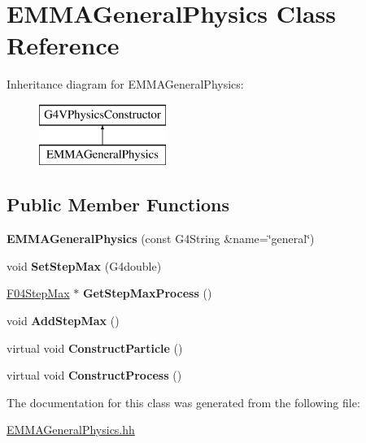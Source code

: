 \hypertarget{classEMMAGeneralPhysics}{\section{E\-M\-M\-A\-General\-Physics Class Reference}
\label{classEMMAGeneralPhysics}
}
Inheritance diagram for E\-M\-M\-A\-General\-Physics\-:\begin{figure}[H]
\begin{center}
\leavevmode
\includegraphics[height=2.000000cm]{classEMMAGeneralPhysics}
\end{center}
\end{figure}
\subsection*{Public Member Functions}
\begin{DoxyCompactItemize}
\item 
\hypertarget{classEMMAGeneralPhysics_a4c397d99e36849b09f1c90b991c97ee5}{{\bfseries E\-M\-M\-A\-General\-Physics} (const G4\-String \&name=\char`\"{}general\char`\"{})}\label{classEMMAGeneralPhysics_a4c397d99e36849b09f1c90b991c97ee5}

\item 
\hypertarget{classEMMAGeneralPhysics_add44611fd7610c537ece041a6e687114}{void {\bfseries Set\-Step\-Max} (G4double)}\label{classEMMAGeneralPhysics_add44611fd7610c537ece041a6e687114}

\item 
\hypertarget{classEMMAGeneralPhysics_a1e59367c9a1a8add4c7363bce36db4e5}{\hyperlink{classF04StepMax}{F04\-Step\-Max} $\ast$ {\bfseries Get\-Step\-Max\-Process} ()}\label{classEMMAGeneralPhysics_a1e59367c9a1a8add4c7363bce36db4e5}

\item 
\hypertarget{classEMMAGeneralPhysics_ae0ef078642a5eac888db8a610d678b69}{void {\bfseries Add\-Step\-Max} ()}\label{classEMMAGeneralPhysics_ae0ef078642a5eac888db8a610d678b69}

\item 
\hypertarget{classEMMAGeneralPhysics_a1013ac2f607a30836aa2aba3e3c60376}{virtual void {\bfseries Construct\-Particle} ()}\label{classEMMAGeneralPhysics_a1013ac2f607a30836aa2aba3e3c60376}

\item 
\hypertarget{classEMMAGeneralPhysics_a930aa9bb0f7c47c2d782da071bb309e8}{virtual void {\bfseries Construct\-Process} ()}\label{classEMMAGeneralPhysics_a930aa9bb0f7c47c2d782da071bb309e8}

\end{DoxyCompactItemize}


The documentation for this class was generated from the following file\-:\begin{DoxyCompactItemize}
\item 
\hyperlink{EMMAGeneralPhysics_8hh}{E\-M\-M\-A\-General\-Physics.\-hh}\end{DoxyCompactItemize}
